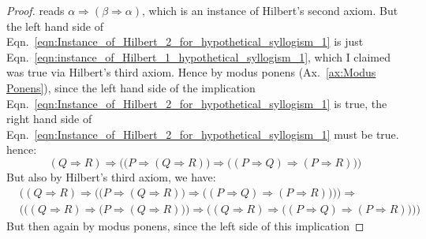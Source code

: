 \begin{proof}
        reads $\alpha\Rightarrow(\beta\Rightarrow\alpha)$, which is an instance
        of Hilbert's second axiom. But the left hand side of
        Eqn.~\ref{eqn:Instance_of_Hilbert_2_for_hypothetical_syllogism_1} is
        just Eqn.~\ref{eqn:instance_of_Hilbert_1_hypothetical_syllogism_1},
        which I claimed was true via Hilbert's third axiom. Hence by modus
        ponens (Ax.~\ref{ax:Modus Ponens}), since the left hand side of the
        implication
        Eqn.~\ref{eqn:Instance_of_Hilbert_2_for_hypothetical_syllogism_1} is
        true, the right hand side of
        Eqn.~\ref{eqn:Instance_of_Hilbert_2_for_hypothetical_syllogism_1} must
        be true. hence:
        \begin{equation}
            (Q\Rightarrow{R})\Rightarrow
            \Big(
                \big(
                    P\Rightarrow(Q\Rightarrow{R})
                \big)
                \Rightarrow
                \big(
                    (P\Rightarrow{Q})\Rightarrow(P\Rightarrow{R})
                \big)
            \Big)
        \end{equation}
        But also by Hilbert's third axiom, we have:
        \begin{equation}
            \label{eqn:hypothetical_syllogism_long_eqn}%
            \begin{split}
                &\bigg(
                    (Q\Rightarrow{R})\Rightarrow
                    \Big(
                        \big(
                            P\Rightarrow(Q\Rightarrow{R})
                        \big)
                        \Rightarrow
                        \big(
                            (P\Rightarrow{Q})\Rightarrow(P\Rightarrow{R})
                        \big)
                    \Big)
                \bigg)
                \Rightarrow\\
                &\bigg(
                    \Big(
                        (Q\Rightarrow{R})\Rightarrow
                        \big(
                            P\Rightarrow(Q\Rightarrow{R})
                        \big)
                    \Big)
                    \Rightarrow
                    \Big(
                        (Q\Rightarrow{R})
                        \Rightarrow
                        \big(
                            (P\Rightarrow{Q})\Rightarrow(P\Rightarrow{R})
                        \big)
                    \Big)
                \bigg)
            \end{split}
        \end{equation}
        But then again by modus ponens, since the left side of this implication

\end{proof}
